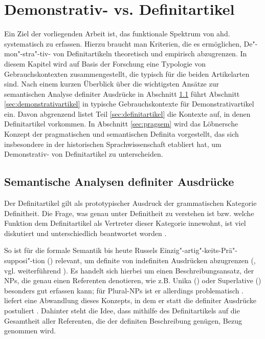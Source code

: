\chapter{Demonstrativ- vs. Definitartikel}\label{chap:demdef}

Ein Ziel der vorliegenden Arbeit ist, das funktionale Spektrum von ahd.  systematisch zu erfassen. Hierzu braucht man Kriterien, die es ermöglichen, De"-mon"-stra"-tiv- von Definitartikeln theoretisch und empirisch  abzugrenzen. In diesem Kapitel wird auf Basis der Forschung eine Typologie von Gebrauchskontexten zusammengestellt, die typisch für die beiden Artikelarten sind. Nach einem kurzen Überblick über die wichtigsten Ansätze zur semantischen Analyse definiter Ausdrücke in Abschnitt \ref{sec:definitheitstheorien} führt Abschnitt \ref{sec:demonstrativartikel} in typische Gebrauchskontexte für Demonstrativartikel ein. Davon abgrenzend listet Teil \ref{sec:definitartikel} die Kontexte auf, in denen Definitartikel vorkommen. In Abschnitt \ref{sec:pragsem} wird das  Löbnersche Konzept der pragmatischen und semantischen Definita vorgestellt, das sich insbesondere in der historischen Sprachwissenschaft etabliert hat, um Demonstrativ- von Definitartikel zu unterscheiden. 

\section{Semantische Analysen definiter Ausdrücke} \label{sec:definitheitstheorien}

Der Definitartikel gilt als prototypischer Ausdruck der grammatischen Kategorie Definitheit. Die Frage, was genau unter Definitheit zu verstehen ist bzw. welche Funktion dem Definitartikel als Vertreter dieser Kategorie innewohnt, ist viel diskutiert und unterschiedlich beantwortet worden \parencite[zum Überblick  s.][]{Bisle-Muller1991,Hauenschild1993,Lyons1999,Abbott2007,Cui2014}.

So ist für die formale Semantik bis heute Russels Einzig"-artig"-keits-Prä"-supposi"-tion () relevant, um definite von indefiniten Ausdrücken abzugrenzen (\cite{Russel1905}, vgl. weiterführend \cite{Heim1991,Heim2011}). Es handelt sich hierbei um einen Beschreibungsansatz, der NPs, die genau einen Referenten denotieren, wie z.B. Unika () oder Superlative () besonders gut erfassen kann; für  Plural-NPs  ist er allerdings problematisch \parencite[vgl. die Diskussion hierzu in][7-11] {Lyons1999}. \textcite{Hawkins1978} liefert eine Abwandlung dieses Konzepts, in dem er statt  die  definiter Ausdrücke postuliert \parencite[kritisch hierzu:][32]{Bisle-Muller1991}. Dahinter steht die Idee, dass mithilfe des Definitartikels auf die Gesamtheit aller Referenten, die der definiten Beschreibung genügen, Bezug genommen wird.

